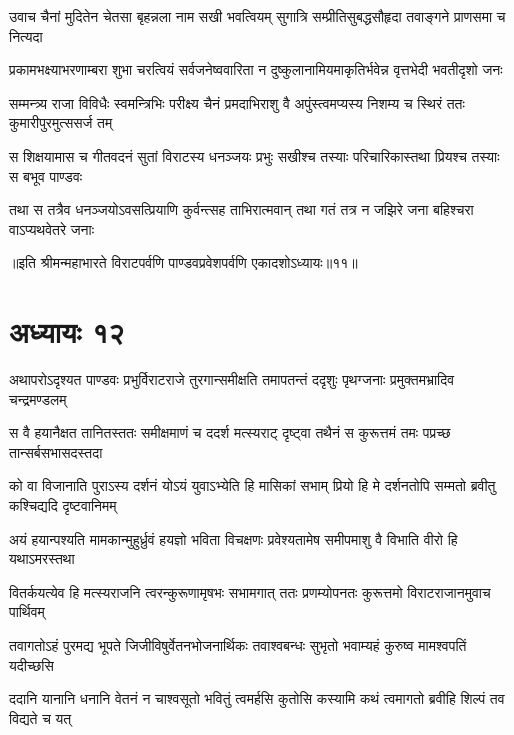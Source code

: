\twolineshloka
{उवाच चैनां मुदितेन चेतसा बृहन्नला नाम सखी भवत्वियम्}
{सुगात्रि सम्प्रीतिसुबद्धसौहृदा तवाङ्गने प्राणसमा च नित्यदा}


\twolineshloka
{प्रकामभक्ष्याभरणाम्बरा शुभा चरत्वियं सर्वजनेष्ववारिता}
{न दुष्कुलानामियमाकृतिर्भवेन्न वृत्तभेदी भवतीदृशो जनः}



\twolineshloka
{सम्मन्त्र्य राजा विविधैः स्वमन्त्रिभिः परीक्ष्य चैनं प्रमदाभिराशु वै}
{अपुंस्त्वमप्यस्य निशम्य च स्थिरं ततः कुमारीपुरमुत्ससर्ज तम्}


\twolineshloka
{स शिक्षयामास च गीतवदनं सुतां विराटस्य धनञ्जयः प्रभुः}
{सखीश्च तस्याः परिचारिकास्तथा प्रियश्च तस्याः स बभूव पाण्डवः}


\twolineshloka
{तथा स तत्रैव धनञ्जयोऽवसत्प्रियाणि कुर्वन्त्सह ताभिरात्मवान्}
{तथा गतं तत्र न जझिरे जना बहिश्चरा वाऽप्यथवेतरे जनाः}

॥इति श्रीमन्महाभारते विराटपर्वणि पाण्डवप्रवेशपर्वणि एकादशोऽध्यायः॥११॥

\chapter{अध्यायः १२}

\twolineshloka
{अथापरोऽदृश्यत पाण्डवः प्रभुर्विराटराजे तुरगान्समीक्षति}
{तमापतन्तं ददृशुः पृथग्जनाः प्रमुक्तमभ्रादिव चन्द्रमण्डलम्}


\twolineshloka
{स वै हयानैक्षत तानितस्ततः समीक्षमाणं च ददर्श मत्स्यराट्}
{दृष्ट्वा तथैनं स कुरूत्तमं तमः पप्रच्छ तान्सर्बसभासदस्तदा}


\twolineshloka
{को वा विजानाति पुराऽस्य दर्शनं योऽयं युवाऽभ्येति हि मासिकां सभाम्}
{प्रियो हि मे दर्शनतोपि सम्मतो ब्रवीतु कश्चिद्यदि दृष्टवानिमम्}


\twolineshloka
{अयं हयान्पश्यति मामकान्मुहुर्ध्रुवं हयज्ञो भविता विचक्षणः}
{प्रवेश्यतामेष समीपमाशु वै विभाति वीरो हि यथाऽमरस्तथा}


\twolineshloka
{वितर्कयत्येव हि मत्स्यराजनि त्वरन्कुरूणामृषभः सभामगात्}
{ततः प्रणम्योपनतः कुरूत्तमो विराटराजानमुवाच पार्थिवम्}


\twolineshloka
{तवागतोऽहं पुरमद्य भूपते जिजीविषुर्वेतनभोजनार्थिकः}
{तवाश्वबन्धः सुभृतो भवाम्यहं कुरुष्व मामश्वपतिं यदीच्छसि}




\twolineshloka
{ददानि यानानि धनानि वेतनं न चाश्वसूतो भवितुं त्वमर्हसि}
{कुतोसि कस्यामि कथं त्वमागतो ब्रवीहि शिल्पं तव विद्यते च यत्}

